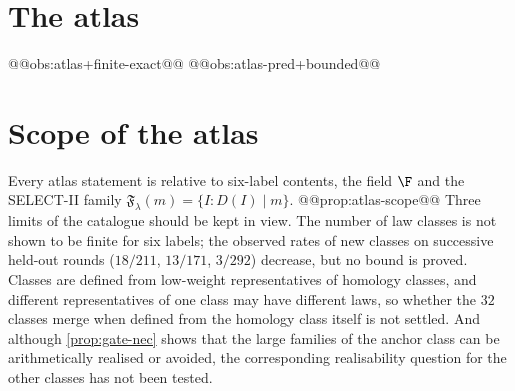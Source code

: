 \section{The atlas}\label{sec:atlas-census}
@@obs:atlas+finite-exact@@
@@obs:atlas-pred+bounded@@

\section{Scope of the atlas}
Every atlas statement is relative to six-label contents, the field $\F$ and the SELECT-II family $\mathfrak F_\lambda(m)=\{I:D(I)\mid m\}$.
@@prop:atlas-scope@@
Three limits of the catalogue should be kept in view. The number of law classes is not shown to be finite for six labels; the observed rates of new classes on successive held-out rounds ($18/211$, $13/171$, $3/292$) decrease, but no bound is proved. Classes are defined from low-weight representatives of homology classes, and different representatives of one class may have different laws, so whether the $32$ classes merge when defined from the homology class itself is not settled. And although \cref{prop:gate-nec} shows that the large families of the anchor class can be arithmetically realised or avoided, the corresponding realisability question for the other classes has not been tested.

